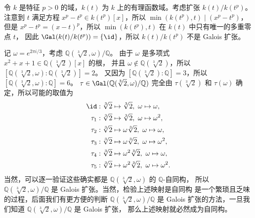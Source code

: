 \begin{example}\label{exa:nonGalois has repeat roots}
  令 $k$ 是特征 $p>0$ 的域，$k(t)$ 为 $k$ 上的有理函数域。考虑扩张 $k(t)/k(t^p)$。
  注意到 $t$ 满足方程 $x^p-t^p\in k(t^p)[x]$，所以 $\min(k(t^p),t) \mid (x^p-t^p)$，
  但是 $x^p-t^p=(x-t)^p$，所以 $\min(k(t^p),t)$ 在 $k(t)$ 中只有唯一的多重零点 $t$，
  因此 $\Gal(k(t)/k(t^p))=\{\id\}$，所以 $k(t)/k(t^p)$ 不是 Galois 扩张。
\end{example}

\begin{example}\label{exa:sqrt 2 and omega on Q}
  记 $\omega=e^{2\pi i/3}$，考虑 $\mathbb{Q}(\sqrt[3]{2},\omega)/\mathbb{Q}$。
  由于 $\omega$ 是多项式 $x^2+x+1\in\mathbb{Q}(\sqrt[3]{2})[x]$ 的根，
  并且 $\omega\notin\mathbb{Q}(\sqrt[3]{2})$，所以 
  $[\mathbb{Q}(\sqrt[3]{2},\omega):\mathbb{Q}(\sqrt[3]{2})]=2$。
  又因为 $[\mathbb{Q}(\sqrt[3]{2}):\mathbb{Q}]=3$，所以 $[\mathbb{Q}(\sqrt[3]{2},\omega):\mathbb{Q}]=6$。
  $\tau\in\Gal(\mathbb{Q}(\sqrt[3]{2},\omega)/\mathbb{Q})$ 完全由 $\tau(\sqrt[3]{2})$ 和
  $\tau(\omega)$ 确定，所以可能的取值为
  \begin{align*}
    \id&:\sqrt[3]{2}\mapsto\sqrt[3]{2},\ \omega\mapsto \omega,\\
    \tau_1&:\sqrt[3]{2}\mapsto\sqrt[3]{2},\ \omega\mapsto \omega^2,\\
    \tau_2&:\sqrt[3]{2}\mapsto \omega\sqrt[3]{2},\ \omega\mapsto \omega,\\
    \tau_3&:\sqrt[3]{2}\mapsto \omega\sqrt[3]{2},\ \omega\mapsto \omega^2,\\
    \tau_4&:\sqrt[3]{2}\mapsto \omega^2\sqrt[3]{2},\ \omega\mapsto \omega,\\
    \tau_5&:\sqrt[3]{2}\mapsto \omega^2\sqrt[3]{2},\ \omega\mapsto \omega^2.
  \end{align*}
  当然，可以逐一验证这些确实都是 $\mathbb{Q}(\sqrt[3]{2},\omega)$ 的 $\mathbb{Q}$-自同构，
  所以 $\mathbb{Q}(\sqrt[3]{2},\omega)/\mathbb{Q}$ 是 Galois 扩张。当然，检验上述映射是自同构
  是一个繁琐且乏味的过程，后面我们有更方便的判断 $\mathbb{Q}(\sqrt[3]{2},\omega)/\mathbb{Q}$ 
  是 Galois 扩张的方法，一旦我们知道 $\mathbb{Q}(\sqrt[3]{2},\omega)/\mathbb{Q}$ 是 Galois 扩张，
  那么上述映射就必然成为自同构。
\end{example}

